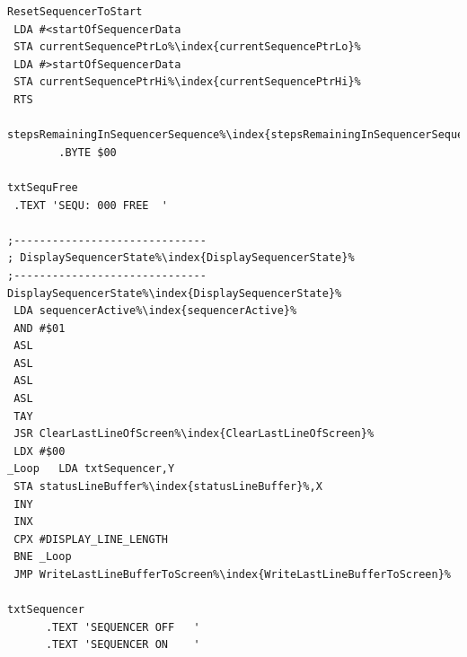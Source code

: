 \begin{minipage}[b]{0.33\linewidth}
\begin{lrbox}{\mybox}
\begin{lstlisting}[basicstyle=\ttfamily\tiny,escapechar=\%]
ResetSequencerToStart
 LDA #<startOfSequencerData
 STA currentSequencePtrLo%\index{currentSequencePtrLo}%
 LDA #>startOfSequencerData
 STA currentSequencePtrHi%\index{currentSequencePtrHi}%
 RTS

stepsRemainingInSequencerSequence%\index{stepsRemainingInSequencerSequence}%   
        .BYTE $00

txtSequFree
 .TEXT 'SEQU: 000 FREE  '

;------------------------------
; DisplaySequencerState%\index{DisplaySequencerState}%
;------------------------------
DisplaySequencerState%\index{DisplaySequencerState}%
 LDA sequencerActive%\index{sequencerActive}%
 AND #$01
 ASL
 ASL
 ASL
 ASL
 TAY
 JSR ClearLastLineOfScreen%\index{ClearLastLineOfScreen}%
 LDX #$00
_Loop   LDA txtSequencer,Y
 STA statusLineBuffer%\index{statusLineBuffer}%,X
 INY
 INX
 CPX #DISPLAY_LINE_LENGTH
 BNE _Loop
 JMP WriteLastLineBufferToScreen%\index{WriteLastLineBufferToScreen}%

txtSequencer
      .TEXT 'SEQUENCER OFF   '
      .TEXT 'SEQUENCER ON    '
\end{lstlisting}
\end{lrbox}%
\scalebox{0.8}{\usebox{\mybox}}
\end{minipage}
